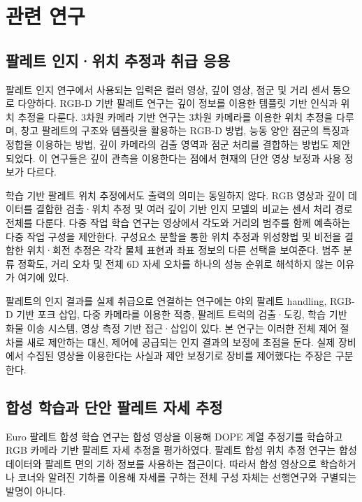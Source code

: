 \section{관련 연구}\label{sec:related}
\subsection{팔레트 인지·위치 추정과 취급 응용}
팔레트 인지 연구에서 사용되는 입력은 컬러 영상, 깊이 영상, 점군 및 거리 센서 등으로 다양하다. RGB-D 기반 팔레트 연구는 깊이 정보를 이용한 템플릿 기반 인식과 위치 추정을 다룬다\cite{xiao2017}. 3차원 카메라 기반 연구는 3차원 카메라를 이용한 위치 추정을 다루며\cite{molter2018}, 창고 팔레트의 구조와 템플릿을 활용하는 RGB-D 방법\cite{zhao2022}, 능동 양안 점군의 특징과 정합을 이용하는 방법\cite{shao2023}, 깊이 카메라의 검출 영역과 점군 처리를 결합하는 방법\cite{hu2025}도 제안되었다. 이 연구들은 깊이 관측을 이용한다는 점에서 현재의 단안 영상 보정과 사용 정보가 다르다.

학습 기반 팔레트 위치 추정에서도 출력의 의미는 동일하지 않다. RGB 영상과 깊이 데이터를 결합한 검출·위치 추정\cite{li2021} 및 여러 깊이 기반 인지 모델의 비교\cite{rocha2023}는 센서 처리 경로 전체를 다룬다. 다중 작업 학습 연구는 영상에서 각도와 거리의 범주를 함께 예측하는 다중 작업 구성을 제안한다\cite{mok2021}. 구성요소 분할을 통한 위치 추정\cite{wu2025}과 위성항법 및 비전을 결합한 위치·회전 추정\cite{meng2024}은 각각 물체 표현과 좌표 정보의 다른 선택을 보여준다. 범주 분류 정확도, 거리 오차 및 전체 6D 자세 오차를 하나의 성능 순위로 해석하지 않는 이유가 여기에 있다.

팔레트의 인지 결과를 실제 취급으로 연결하는 연구에는 야외 팔레트 handling\cite{iinuma2020}, RGB-D 기반 포크 삽입\cite{iinuma2021d}, 다중 카메라를 이용한 적층\cite{iinuma2021s}, 팔레트 트럭의 검출·도킹\cite{tsiogas2021}, 학습 기반 화물 이송 시스템\cite{ren2022}, 영상 측정 기반 접근·삽입\cite{kita2026}이 있다. 본 연구는 이러한 전체 제어 절차를 새로 제안하는 대신, 제어에 공급되는 인지 결과의 보정에 초점을 둔다. 실제 장비에서 수집된 영상을 이용한다는 사실과 제안 보정기로 장비를 제어했다는 주장은 구분한다.

\subsection{합성 학습과 단안 팔레트 자세 추정}
Euro 팔레트 합성 학습 연구는 합성 영상을 이용해 DOPE 계열 추정기를 학습하고 RGB 카메라 기반 팔레트 자세 추정을 평가하였다\cite{knitt2022}. 팔레트 합성 위치 추정 연구는 합성 데이터와 팔레트 면의 기하 정보를 사용하는 접근이다\cite{mueller2024}. 따라서 합성 영상으로 학습하거나 코너와 알려진 기하를 이용해 자세를 구하는 전체 구성 자체는 선행연구와 구별되는 발명이 아니다.

